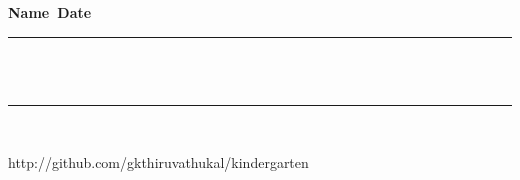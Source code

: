 \documentclass[10pt,landscape,letterpaper]{article}
\begin{document}
{\bf Name\ \underline{\hskip 200pt}\hskip 200pt}{\bf Date\
\underline{\hskip 150pt}}

\vskip 1cm

{
\vskip 10pt
\rule[1.75ex]{10in}{1pt}
\\
\hdashrule{10.25in}{1pt}{4mm}
\\
\rule[-1.75ex]{10in}{1pt}
\\
}

\vskip 1cm

http://github.com/gkthiruvathukal/kindergarten
\end{document}
